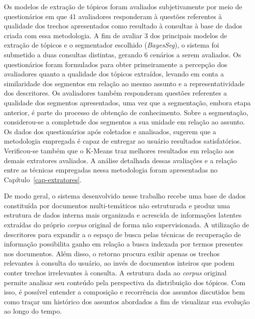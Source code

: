 

Os modelos de extração de tópicos foram avaliados subjetivamente por meio de questionários em que 41 avaliadores responderam à questões referentes à qualidade dos trechos apresentados como resultado à consultas à base de dados criada com essa metodologia. 
A fim de avaliar 3 dos principais modelos de extração de tópicos e o segmentador escolhido (\textit{BayesSeg}), o sistema foi submetido a duas consultas distintas, gerando 6 cenários a serem avaliados. 
Os questionários foram formulados para obter primeiramente a percepção dos avaliadores quanto a qualidade dos tópicos extraídos, levando em conta a similaridade dos segmentos em relação ao mesmo assunto e a representatividade dos descritores. 
Os avaliadores também responderam questões referentes a qualidade dos segmentos apresentados, uma vez que a segmentação, embora etapa anterior, é parte do processo de obtenção de conhecimento. Sobre a segmentação, considerou-se a completude dos segmentos a sua unidade em relação ao assunto.
Os dados dos questionários após coletados e analisados, sugerem que a metodologia empregada é capaz de entregar ao usuário resultados satisfatórios. Verificou-se também que o K-Means traz melhores resultados em relação aos demais extratores avaliados. 
A análise detalhada dessas avaliações e a relação entre as técnicas empregadas nessa metodologia foram apresentadas no Capítulo~\ref{cap-extratores}.





De modo geral, o sistema desenvolvido nesse trabalho recebe uma base de dados constituída por documentos multi-temáticos não estruturada e produz uma estrutura de dados interna mais organizada e acrescida de informações latentes extraídas do próprio \textit{corpus} original de forma não supervisionada. 
A utilização de descritores para expandir a o espaço de busca pelas técnicas de recuperação de informação possibilita ganho em relação a busca indexada por termos presentes nos documentos. Além disso, o retorno procura exibir apenas os trechos relevantes à consulta do usuário, ao invés de documentos inteiros que podem conter trechos irrelevantes à consulta.  
A estrutura dada ao \textit{corpus} original permite analisar seu conteúdo pela perspectiva da distribuição dos tópicos. Com isso, é possível entender a composição e recorrência dos assuntos discutidos bem como traçar um histórico dos assuntos abordados a fim de visualizar sua evolução ao longo do tempo.



